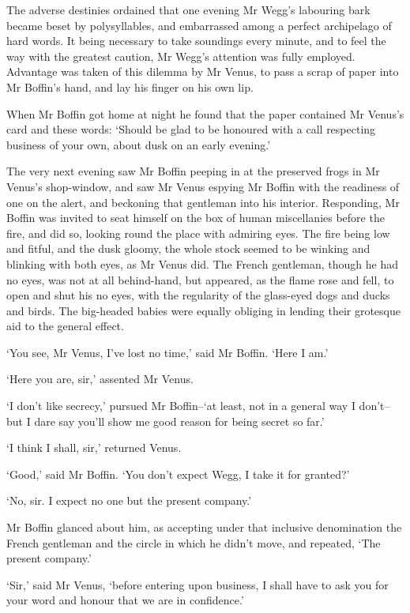 The adverse destinies ordained that one evening Mr Wegg’s labouring
bark became beset by polysyllables, and embarrassed among a perfect
archipelago of hard words. It being necessary to take soundings every
minute, and to feel the way with the greatest caution, Mr Wegg’s
attention was fully employed. Advantage was taken of this dilemma by
Mr Venus, to pass a scrap of paper into Mr Boffin’s hand, and lay his
finger on his own lip.

When Mr Boffin got home at night he found that the paper contained Mr
Venus’s card and these words: ‘Should be glad to be honoured with a call
respecting business of your own, about dusk on an early evening.’

The very next evening saw Mr Boffin peeping in at the preserved frogs
in Mr Venus’s shop-window, and saw Mr Venus espying Mr Boffin with the
readiness of one on the alert, and beckoning that gentleman into his
interior. Responding, Mr Boffin was invited to seat himself on the box
of human miscellanies before the fire, and did so, looking round the
place with admiring eyes. The fire being low and fitful, and the dusk
gloomy, the whole stock seemed to be winking and blinking with both
eyes, as Mr Venus did. The French gentleman, though he had no eyes, was
not at all behind-hand, but appeared, as the flame rose and fell, to
open and shut his no eyes, with the regularity of the glass-eyed dogs
and ducks and birds. The big-headed babies were equally obliging in
lending their grotesque aid to the general effect.

‘You see, Mr Venus, I’ve lost no time,’ said Mr Boffin. ‘Here I am.’

‘Here you are, sir,’ assented Mr Venus.

‘I don’t like secrecy,’ pursued Mr Boffin--‘at least, not in a general
way I don’t--but I dare say you’ll show me good reason for being secret
so far.’

‘I think I shall, sir,’ returned Venus.

‘Good,’ said Mr Boffin. ‘You don’t expect Wegg, I take it for granted?’

‘No, sir. I expect no one but the present company.’

Mr Boffin glanced about him, as accepting under that inclusive
denomination the French gentleman and the circle in which he didn’t
move, and repeated, ‘The present company.’

‘Sir,’ said Mr Venus, ‘before entering upon business, I shall have to
ask you for your word and honour that we are in confidence.’

